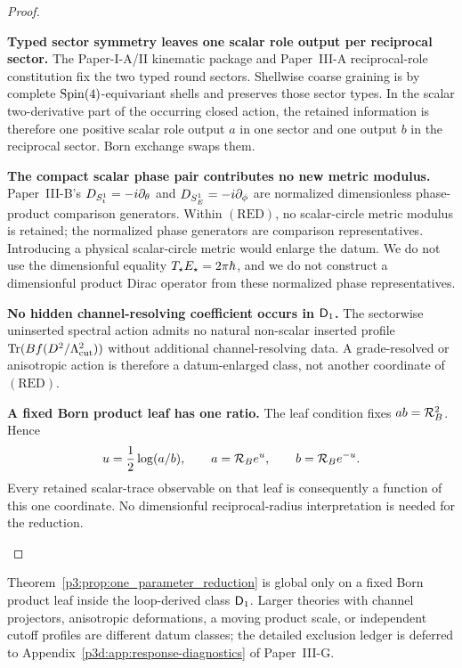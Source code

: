 \documentclass[12pt,a4paper]{article}
\begin{document}
\begin{proof}
\begin{proofsteps}
\item \textbf{Typed sector symmetry leaves one scalar role output per reciprocal sector.}
The Paper-I-A/II kinematic package and Paper~III-A reciprocal-role constitution
fix the two typed round sectors.  Shellwise coarse graining is by complete
\(\mathrm{Spin}(4)\)-equivariant shells and preserves those sector types.  In the
scalar two-derivative part of the occurring closed action, the retained information is
therefore one positive scalar role output \(a\) in one sector and one output
\(b\) in the reciprocal sector.  Born exchange swaps them.

\item \textbf{The compact scalar phase pair contributes no new metric modulus.}
Paper~III-B's \(D_{S^1_t}=-i\partial_\theta\) and
\(D_{S^1_E}=-i\partial_\phi\) are normalized dimensionless phase-product
comparison generators.  Within \((\mathrm{RED})\), no scalar-circle metric modulus is retained; the
normalized phase generators are comparison representatives.  Introducing a
physical scalar-circle metric would enlarge the datum.  We do
not use the dimensionful equality \(T_\star E_\star=2\pi\hbar\), and we do not
construct a dimensionful product Dirac operator from these normalized phase
representatives.

\item \textbf{No hidden channel-resolving coefficient occurs in \(\mathsf{D}_1\).}
The sectorwise uninserted spectral action admits no natural non-scalar inserted
profile \(\operatorname{Tr}(Bf(D^2/\Lambda_{\mathrm{cut}}^2))\) without additional channel-resolving data.
A grade-resolved or anisotropic action is therefore a datum-enlarged class,
not another coordinate of \((\mathrm{RED})\).

\item \textbf{A fixed Born product leaf has one ratio.}
The leaf condition fixes \(ab=\mathcal R_B^2\).  Hence
\[
 u=\frac12\log(a/b),
 \qquad
 a=\mathcal R_B e^u,
 \qquad
 b=\mathcal R_B e^{-u}.
\]
Every retained scalar-trace observable on that leaf is consequently a function
of this one coordinate.  No dimensionful reciprocal-radius interpretation is
needed for the reduction.
\end{proofsteps}
\end{proof}

\begin{remark}
\label{p3:rem:no-hidden-beta-system}
Theorem~\ref{p3:prop:one_parameter_reduction} is global only on a fixed Born
product leaf inside the loop-derived class \(\mathsf{D}_1\).  Larger theories with
channel projectors, anisotropic deformations, a moving product scale, or
independent cutoff profiles are different datum classes; the detailed
exclusion ledger is deferred to Appendix~\ref{p3d:app:response-diagnostics} of Paper~III-G.
\end{remark}
\end{document}
